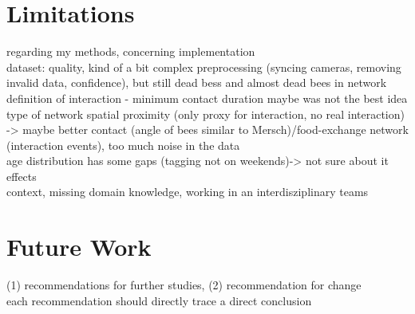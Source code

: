 \section{Limitations}
regarding my methods, concerning implementation\\
dataset: quality, kind of a bit complex preprocessing (syncing cameras, removing invalid data, confidence), but still dead bess and almost dead bees in network\\
definition of interaction - minimum contact duration maybe was not the best idea\\
type of network spatial proximity (only proxy for interaction, no real interaction) -> maybe better contact (angle of bees similar to Mersch)/food-exchange network (interaction events), too much noise in the data\\


age distribution has some gaps (tagging not on weekends)-> not sure about it effects\\
context, missing domain knowledge, working in an interdisziplinary teams\\

\section{Future Work}
(1) recommendations for further studies, (2) recommendation for change\\
each recommendation should directly trace a direct conclusion\\

